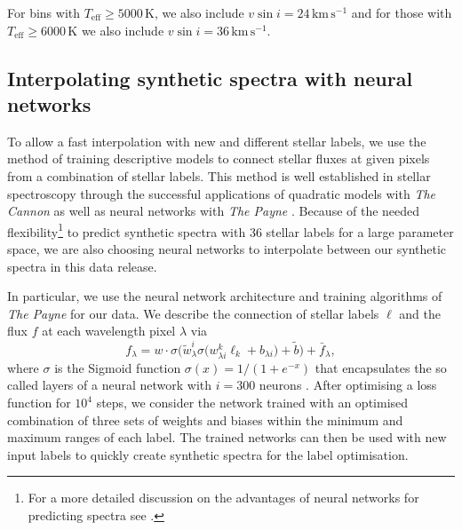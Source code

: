 \documentclass[
  journal=pasa,
  manuscript=research-paper, %
  year=2023,
  volume=37
]{cup-journal}
\newcommand{\Teff}{$T_\mathrm{eff}$\xspace}
\newcommand{\vsini}{$v \sin i$\xspace}
\newcommand{\kms}{\,\mathrm{km\,s^{-1}}}	%
\begin{document}
For bins with \Teff$\geq 5000\,\mathrm{K}$, we also include $v \sin i = 24 \kms$ and for those with \Teff$\geq 6000\,\mathrm{K}$ we also include $v \sin i = 36 \kms$. 

\subsection{Interpolating synthetic spectra with neural networks} \label{sec:interpolating_synthetic_spectra_with_neural_networks}

To allow a fast interpolation with new and different stellar labels, we use the method of training descriptive models to connect stellar fluxes at given pixels from a combination of stellar labels. This method is well established in stellar spectroscopy through the successful applications of quadratic models with \textit{The Cannon} \citep[see e.g.][]{Ness2015, Ness2016, Casey2016, Casey2017, Ho2017, Buder2018} as well as neural networks with \textit{The Payne} \citep[see e.g.][]{Ting2019, Xiang2019, Xiang2021}. Because of the needed flexibility\footnote{For a more detailed discussion on the advantages of neural networks for predicting spectra see \citet{Ting2019}.} to predict synthetic spectra with 36 stellar labels for a large parameter space, we are also choosing neural networks to interpolate between our synthetic spectra in this data release.

In particular, we use the neural network architecture and training algorithms of \textit{The Payne} \citep{Ting2019} for our data. We describe the connection of stellar labels $\boldsymbol{\ell}$ and the flux $f$ at each wavelength pixel $\lambda$ via
\begin{equation}
f_\lambda = w \cdot \sigma\bigg( \tilde{w}_\lambda^i \sigma \Big( w^k_{\lambda i} \ell_k + b_{\lambda i} \Big) + \tilde{b} \bigg) + \bar{f}_\lambda,
\label{eq:neural_network_function}
\end{equation}
where $\sigma$ is the Sigmoid function $\sigma (x) = 1/(1 + e^{-x})$ that encapsulates the so called layers of a neural network with $i = 300$ neurons \citep[see ][for more details]{Ting2019}. After optimising a loss function for $10^4$ steps, we consider the network trained with an optimised combination of three sets of weights and biases within the minimum and maximum ranges of each label. The trained networks can then be used with new input labels to quickly create synthetic spectra for the label optimisation.
\end{document}
